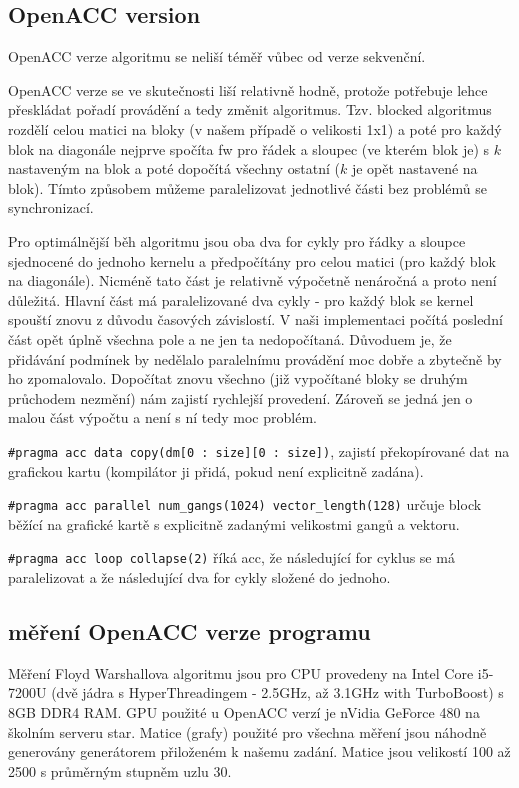 \documentclass[11pt, fleqn]{article}
\begin{document}
\subsection{OpenACC version}
OpenACC verze algoritmu se neliší téměř vůbec od verze sekvenční.

OpenACC verze se ve skutečnosti liší relativně hodně, protože potřebuje lehce přeskládat pořadí provádění a tedy změnit algoritmus. Tzv. blocked algoritmus rozdělí celou matici na bloky (v našem případě o velikosti 1x1) a poté pro každý blok na diagonále nejprve spočíta fw pro řádek a sloupec (ve kterém blok je) s $k$ nastaveným na blok a poté dopočítá všechny ostatní ($k$ je opět nastavené na blok). Tímto způsobem můžeme paralelizovat jednotlivé části bez problémů se synchronizací.

Pro optimálnější běh algoritmu jsou oba dva for cykly pro řádky a sloupce sjednocené do jednoho kernelu a předpočítány pro celou matici (pro každý blok na diagonále). Nicméně tato část je relativně výpočetně nenáročná a proto není důležitá. Hlavní část má paralelizované dva cykly - pro každý blok se kernel spouští znovu z důvodu časových závislostí. V naši implementaci počítá poslední část opět úplně všechna pole a ne jen ta nedopočítaná. Důvoduem je, že přidávání podmínek by nedělalo paralelnímu provádění moc dobře a zbytečně by ho zpomalovalo. Dopočítat znovu všechno (již vypočítané bloky se druhým průchodem nezmění) nám zajistí rychlejší provedení. Zároveň se jedná jen o malou část výpočtu a není s ní tedy moc problém.

\lstinline{#pragma acc data copy(dm[0 : size][0 : size])}, zajistí překopírované dat na grafickou kartu (kompilátor ji přidá, pokud není explicitně zadána).

\lstinline{#pragma acc parallel num_gangs(1024) vector_length(128)} určuje block běžící na grafické kartě s explicitně zadanými velikostmi gangů a vektoru.

\lstinline{#pragma acc loop collapse(2)} říká acc, že následující for cyklus se má paralelizovat a že následující dva for cykly složené do jednoho.


\subsection{měření OpenACC verze programu}

Měření Floyd Warshallova algoritmu jsou pro CPU provedeny na Intel Core i5-7200U (dvě jádra s HyperThreadingem - 2.5GHz, až 3.1GHz with TurboBoost) s 8GB DDR4 RAM. GPU použité u OpenACC verzí je nVidia GeForce 480 na školním serveru star. Matice (grafy) použité pro všechna měření jsou náhodně generovány generátorem přiloženém k našemu zadání. Matice jsou velikostí 100 až 2500 s průměrným stupněm uzlu 30.
\end{document}
